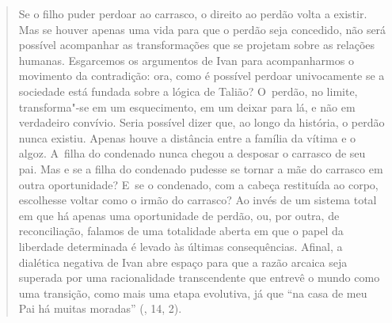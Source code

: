 {\begin{quote}
Se o filho puder perdoar ao carrasco, o direito ao perdão volta a
existir. Mas se houver apenas uma vida para que o perdão seja concedido,
não será possível acompanhar as transformações que se projetam sobre as
relações humanas. Esgarcemos os argumentos de Ivan para acompanharmos o
movimento da contradição: ora, como é possível perdoar univocamente se a
sociedade está fundada sobre a lógica de Talião? O~perdão, no limite,
transforma"-se em um esquecimento, em um deixar para lá, e não em
verdadeiro convívio. Seria possível dizer que, ao longo da história, o
perdão nunca existiu. Apenas houve a distância entre a família da vítima
e o algoz. A~filha do condenado nunca chegou a desposar o carrasco de
seu pai. Mas e se a filha do condenado pudesse se tornar a mãe do
carrasco em outra oportunidade? E~se o condenado, com a cabeça
restituída ao corpo, escolhesse voltar como o irmão do carrasco? Ao
invés de um sistema total em que há apenas uma oportunidade de perdão,
ou, por outra, de reconciliação, falamos de uma totalidade aberta em que
o papel da liberdade determinada é levado às últimas consequências.
Afinal, a dialética negativa de Ivan abre espaço para que a razão
arcaica seja superada por uma racionalidade transcendente que entrevê o
mundo como uma transição, como mais uma etapa evolutiva, já que ``na
casa de meu Pai há muitas moradas'' (, 14, 2).


\end{quote}}
